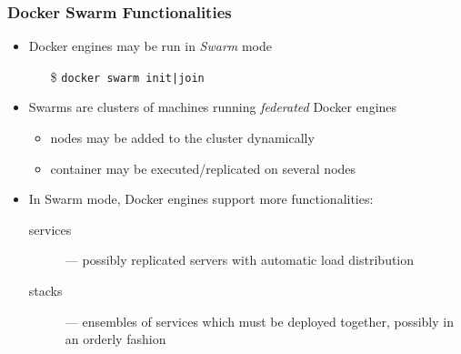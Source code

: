 \documentclass[presentation]{beamer}\mode<presentation>{\usetheme{AMSBolognaFC}}
\begin{document}
\begin{frame}%
    \frametitle{Docker Swarm Functionalities}
    \label{frame:swarm}

    \begin{itemize}
        \item Docker engines may be run in \emph{Swarm} mode
        \begin{itemize}
            \item[\$] \texttt{docker swarm init{\color{gray}|join}}
        \end{itemize}

        \vfill

        \item Swarms are \alert{clusters} of machines running \emph{federated} Docker engines
        \begin{itemize}
            \item nodes may be added to the cluster dynamically
            \item container may be executed/replicated on several nodes
        \end{itemize}

        \vfill

        \item In Swarm mode, Docker engines support more functionalities:
        \begin{description}
                \item[services] --- possibly \alert{replicated} servers with automatic load distribution
            \item[stacks] --- ensembles of services which must be deployed together, possibly in an orderly fashion
        \end{description}
    \end{itemize}

\end{frame}



\end{document}
